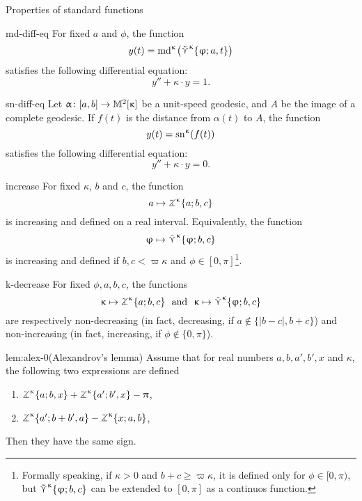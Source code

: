 \begin{thm}{Properties of standard functions}\label{md-equalities}

\begin{subthm}{md-diff-eq}
For fixed $a$ and $\phi$, the function 
\[y(t)=\mathrm{md}^{\upkappa}\hskip-0.1em\left(\mathop{\tilde\curlyvee}\nolimits^{\upkappa}\{\upvarphi;a,t\}\right)\]
 satisfies the following differential equation:
\[y''+\kappa\cdot y=1.\]
\end{subthm}

\begin{subthm}{sn-diff-eq}
Let $\alpha\:[a,b]\to\Lob2\kappa$ be a unit-speed geodesic, and $A$ be the image of a complete geodesic.  If $f(t)$ is the distance from $\alpha(t)$ to $A$, the function 
\[y(t)=\mathrm{sn}^{\upkappa} (f(t))\]
 satisfies the following differential equation:
\[y''+\kappa\cdot y=0.\]
\end{subthm}

\begin{subthm}{increase}
For fixed $\kappa$, $b$ and $c$, the function 
\[a\mapsto\tangle\mc\kappa\{a;b,c\}\]
is increasing and defined on a real interval.
Equivalently, the function
\[\phi\mapsto\side\kappa \{\phi;b,c\}\]
is increasing and defined if $b,c<\varpi\kappa$ and $\phi\in[0,\pi]$\footnote{Formally speaking, if $\kappa>0$ and $b+c\ge \varpi\kappa$, it is defined only for $\phi\in[0,\pi)$, but $\mathop{\tilde\curlyvee}\nolimits^{\upkappa} \{\upvarphi;b,c\}$ can be extended to $[0,\pi]$ as a continuos function.}.
\end{subthm}

\begin{subthm}{k-decrease}
For fixed $\phi,a,b,c$, the functions
\[\kappa\mapsto \tangle\mc\kappa\{a;b,c\}\ \ \text{and}\ \ \kappa\mapsto \side\kappa \{\phi;b,c\}\]
are respectively non-decreasing (in fact, decreasing, if $a\notin\{|b-c|, b+c\}$) and non-increasing (in fact, increasing, if $\phi\notin\{0,\pi\}$).
\end{subthm}

\begin{subthm}{lem:alex-0}(Alexandrov's lemma)
Assume that for real numbers $a,b,a',b', x$ and $\kappa$, the following two expressions are defined
\begin{enumerate}
\item $\tangle\mc\kappa\{a;b,x\}+\tangle\mc\kappa\{a';b',x\}-\pi$,
\item $\tangle\mc\kappa\{a';b+b',a\}-\tangle\mc\kappa\{x;a,b\}$,
\end{enumerate}
Then they have the same sign.
\end{subthm}
\end{thm}


